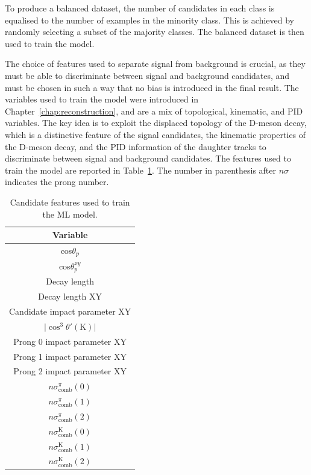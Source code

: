 \begin{sloppypar}
To produce a balanced dataset, the number of candidates in each class is equalised to the number of examples in the minority class. This is achieved by randomly selecting a subset of the majority classes. The balanced dataset is then used to train the model.
\end{sloppypar}

The choice of features used to separate signal from background is crucial, as they must be able to discriminate between signal and background candidates, and must be chosen in such a way that no bias is introduced in the final result. The variables used to train the model were introduced in Chapter~\ref{chap:reconstruction}, and are a mix of topological, kinematic, and PID variables. The key idea is to exploit the displaced topology of the D-meson decay, which is a distinctive feature of the signal candidates, the kinematic properties of the D-meson decay, and the PID information of the daughter tracks to discriminate between signal and background candidates. The features used to train the model are reported in Table~\ref{tab:ml_training_vars}. The number in parenthesis after $n\sigma$ indicates the prong number.

\begin{table}[htb]
    \begin{center}
    \caption{Candidate features used to train the ML model.}
    \label{tab:ml_training_vars}
    \vspace*{0.3cm}
    \begin{tabular}{c}
         \toprule
         Variable\\
         \midrule         
         cos$\theta_{p}$\\
         cos$\theta_{p}^{xy}$\\
         Decay length\\
         Decay length XY\\
         Candidate impact parameter XY\\
         $\lvert \cos^{3}\theta'(\mathrm K)\rvert$\\
         Prong 0 impact parameter XY\\
         Prong 1 impact parameter XY\\
         Prong 2 impact parameter XY\\
         $n\sigma_\mathrm{comb}^{\pi}(0)$\\         
         $n\sigma_\mathrm{comb}^{\pi}(1)$\\
         $n\sigma_\mathrm{comb}^{\pi}(2)$\\
         $n\sigma_\mathrm{comb}^{\mathrm K}(0)$\\
         $n\sigma_\mathrm{comb}^{\mathrm K}(1)$\\
         $n\sigma_\mathrm{comb}^{\mathrm K}(2)$\\
         \bottomrule
    \end{tabular}
    \end{center}
\end{table}

